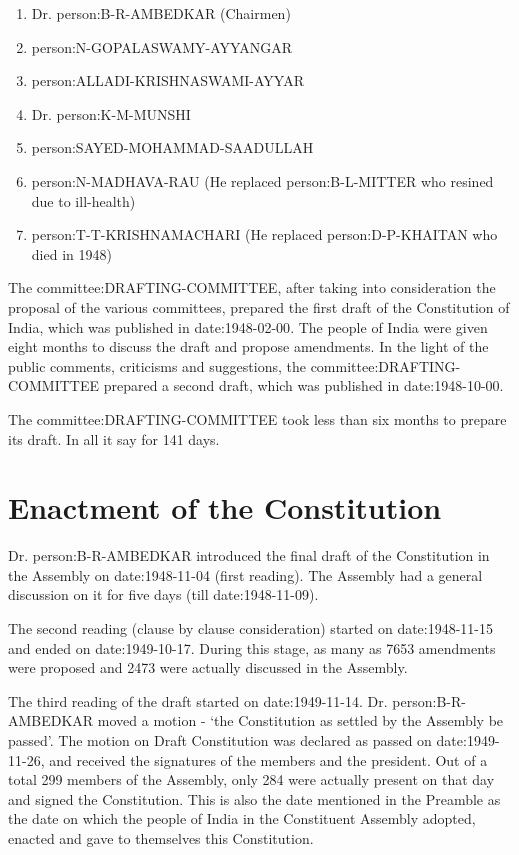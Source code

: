 \begin{multicols}{2}
\begin{enumerate}
  \item Dr. \gls{person:B-R-AMBEDKAR} ({ Chairmen})
  \item \gls{person:N-GOPALASWAMY-AYYANGAR}
  \item \gls{person:ALLADI-KRISHNASWAMI-AYYAR}
  \item Dr. \gls{person:K-M-MUNSHI}
  \item \gls{person:SAYED-MOHAMMAD-SAADULLAH}
  \item \gls{person:N-MADHAVA-RAU} (He replaced \gls{person:B-L-MITTER} who resined due to ill-health)
  \item \gls{person:T-T-KRISHNAMACHARI} (He replaced \gls{person:D-P-KHAITAN} who died in 1948)
\end{enumerate}

The \gls{committee:DRAFTING-COMMITTEE}, after taking into consideration the proposal of the various committees, prepared the first draft of the Constitution of India, which was published in \gls{date:1948-02-00}. The people of India were given eight months to discuss the draft and propose amendments. In the light of the public comments, criticisms and suggestions, the \gls{committee:DRAFTING-COMMITTEE} prepared a second draft, which was published in \gls{date:1948-10-00}.

The \gls{committee:DRAFTING-COMMITTEE} took less than six months to prepare its draft. In all it say for 141 days.

\section{Enactment of the Constitution}

Dr. \gls{person:B-R-AMBEDKAR} introduced the final draft of the Constitution in the Assembly on \gls{date:1948-11-04} (first reading). The Assembly had a general discussion on it for five days (till \gls{date:1948-11-09}).

The second reading (clause by clause consideration) started on \gls{date:1948-11-15} and ended on \gls{date:1949-10-17}. During this stage, as many as 7653 amendments were proposed and 2473 were actually discussed in the Assembly.

The third reading of the draft started on \gls{date:1949-11-14}. Dr. \gls{person:B-R-AMBEDKAR} moved a motion - `the Constitution as settled by the Assembly be passed'. The motion on Draft Constitution was declared as passed on \gls{date:1949-11-26}, and received the signatures of the members and the president. Out of a total 299 members of the Assembly, only 284 were actually present on that day and signed the Constitution. This is also the date mentioned in the Preamble as the date on which the people of India in the Constituent Assembly adopted, enacted and gave to themselves this Constitution.


\end{multicols}
